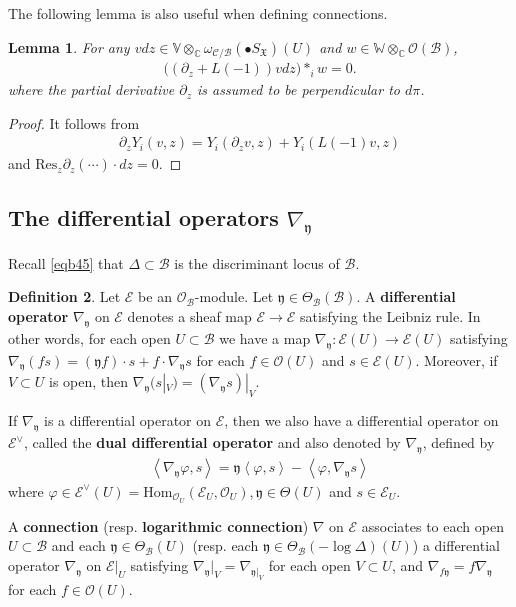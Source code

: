 \documentclass[11pt,b5paper,notitlepage]{article}
\theoremstyle{definition}
\newtheorem{df}{Definition}[subsection]
\theoremstyle{plain}
\newtheorem{lm}[df]{Lemma}
\newcommand{\mc}{\mathcal}
\newcommand{\Hom}{\mathrm{Hom}}
\newcommand{\Res}{\mathrm{Res}}
\newcommand{\scr}{\mathscr}
\newcommand{\yk}{\mathfrak y}
\newcommand{\blt}{\bullet}
\newcommand{\Vbb}{\mathbb V}
\newcommand{\Wbb}{\mathbb W}
\newcommand{\Cbb}{\mathbb C}
\newcommand{\<}{\left\langle}
\renewcommand{\>}{\right\rangle}
\newcommand{\MO}{\mathcal{O}}
\newcommand{\MC}{\mathcal{C}}
\newcommand{\MB}{\mathcal{B}}
\newcommand{\fx}{\mathfrak{X}}
\numberwithin{equation}{subsection}
\begin{document}
The following lemma is also useful when defining connections.
\begin{lm}\label{commutator777}
    For any $vdz\in \Vbb\otimes_\Cbb \omega_{\MC/\MB}(\blt S_\fx)(U)$ and $w\in \Wbb\otimes_\Cbb \MO(\MB)$, 
    \begin{align}
        \big((\partial_z+L(-1)) vdz\big)*_i w=0.
    \end{align}
where the partial derivative $\partial_z$ is assumed to be perpendicular to $d\pi$.
\end{lm}
\begin{proof}
    It follows from
    \begin{align*}
        \partial_z Y_i(v,z)=Y_i(\partial_z v,z)+Y_i(L(-1)v,z)
    \end{align*}
    and $\Res_z \partial_z(\cdots)\cdot dz=0$.
\end{proof}

\subsection{The differential operators $\nabla_\yk$}\label{lbb17}

Recall \eqref{eqb45} that $\Delta\subset\mc B$ is the discriminant locus of $\mc B$.

\begin{df}\label{lbb18}
Let $\scr E$ be an $\mc O_\MB$-module. Let $\yk\in\Theta_\MB(\mc B)$. A \textbf{differential operator} $\nabla_\yk$ on $\scr E$ denotes a sheaf map $\scr E\rightarrow\scr E$ satisfying the Leibniz rule. In other words, for each open $U\subset\mc B$ we have a map $\nabla_\yk:\scr E(U)\rightarrow\scr E(U)$ satisfying $\nabla_\yk(fs)=(\yk f)\cdot s+f\cdot \nabla_\yk s$ for each $f\in\mc O(U)$ and $s\in\scr E(U)$. Moreover, if $V\subset U$ is open, then $\nabla_\yk(s|_V)=(\nabla_\yk s)|_V$.

If $\nabla_\yk$ is a differential operator on $\scr E$, then we also have a differential operator on $\scr E^\vee$, called the \textbf{dual differential operator} and also denoted by $\nabla_\yk$, defined by
    \begin{align}\label{notation1}
        \<\nabla_\yk \varphi,s\>=\yk\<\varphi,s\>-\<\varphi,\nabla_\yk s\>
    \end{align}
    where $\varphi\in \scr E^\vee(U)=\Hom_{\MO_U}(\scr E_U,\MO_U),\yk\in \Theta(U)$ and $s\in \scr E_U$.  


A \textbf{connection} (resp. \textbf{logarithmic connection}) $\nabla$ on $\scr E$ associates to each open $U\subset\mc B$ and each $\yk\in\Theta_\MB(U)$ (resp. each $\yk\in\Theta_\MB(-\log\Delta)(U)$) a differential operator $\nabla_\yk$ on $\scr E|_U$ satisfying $\nabla_\yk|_V=\nabla_{\yk|_V}$ for each open $V\subset U$, and $\nabla_{f\yk}=f\nabla_\yk$ for each $f\in\mc O(U)$. \hfill\qedsymbol
\end{df}
\end{document}

